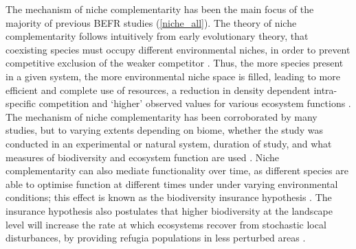 \begin{refsection}
The mechanism of niche complementarity has been the main focus of the majority of previous BEFR studies \citep{Wright2017} (\autoref{niche_all}). The theory of niche complementarity follows intuitively from early evolutionary theory, that coexisting species must occupy different environmental niches, in order to prevent competitive exclusion of the weaker competitor \citep{Tobner2016, Levine2009, MacArthur1955}. Thus, the more species present in a given system, the more environmental niche space is filled, leading to more efficient and complete use of resources, a reduction in density dependent intra-specific competition and `higher' observed values for various ecosystem functions \citep{Isbell2013}. The mechanism of niche complementarity has been corroborated by many studies, but to varying extents depending on biome, whether the study was conducted in an experimental or natural system, duration of study, and what measures of biodiversity and ecosystem function are used \citep{Wright2017, Cardinale2009, Cardinale2011}. Niche complementarity can also mediate functionality over time, as different species are able to optimise function at different times under under varying environmental conditions; this effect is known as the biodiversity insurance hypothesis \citep{Morin2014b, Bartomeus2013, Yachi1999a}. The insurance hypothesis also postulates that higher biodiversity at the landscape level will increase the rate at which ecosystems recover from stochastic local disturbances, by providing refugia populations in less perturbed areas \citep{Gonzalez2009}. 


\end{refsection}

